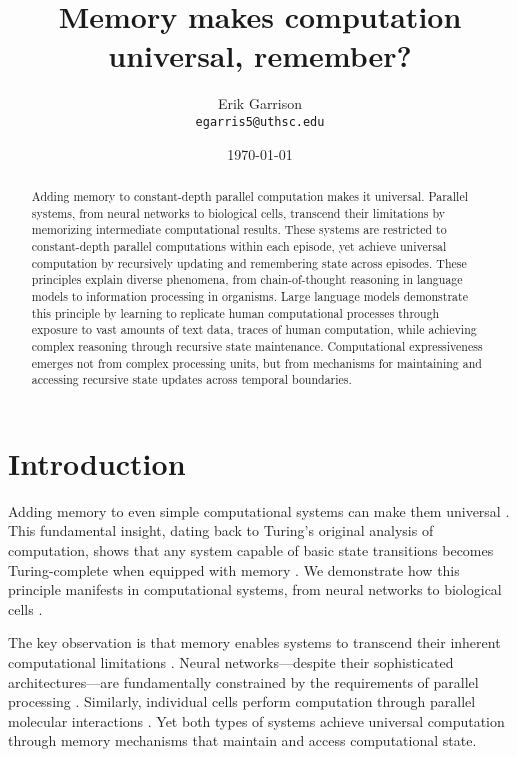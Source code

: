 \documentclass[12pt]{article}
\title{Memory makes computation universal, remember?}
\author{Erik Garrison\\
  \texttt{egarris5@uthsc.edu}\\[1ex]
  }
\date{\today}
\begin{document}
\maketitle

\begin{abstract}
Adding memory to constant-depth parallel computation makes it universal.
Parallel systems, from neural networks to biological cells, transcend their limitations by memorizing intermediate computational results.
These systems are restricted to constant-depth parallel computations within each episode, yet achieve universal computation by recursively updating and remembering state across episodes.
These principles explain diverse phenomena, from chain-of-thought reasoning in language models to information processing in organisms.
Large language models demonstrate this principle by learning to replicate human computational processes through exposure to vast amounts of text data, traces of human computation, while achieving complex reasoning through recursive state maintenance.
Computational expressiveness emerges not from complex processing units, but from mechanisms for maintaining and accessing recursive state updates across temporal boundaries.
\end{abstract}

\section{Introduction}
Adding memory to even simple computational systems can make them universal \cite{merrill2023parallelism,peng2024limitations}. This fundamental insight, dating back to Turing's original analysis of computation, shows that any system capable of basic state transitions becomes Turing-complete when equipped with memory \cite{swamy1983space,bisaz2024memory}. We demonstrate how this principle manifests in computational systems, from neural networks to biological cells \cite{wang2023parallel}.

The key observation is that memory enables systems to transcend their inherent computational limitations \cite{barrett2019analyzing,ganguli2018intertwined}. Neural networks---despite their sophisticated architectures---are fundamentally constrained by the requirements of parallel processing \cite{cai2024efficient}. Similarly, individual cells perform computation through parallel molecular interactions \cite{fu2023scgrn,hoel2020emergence}. Yet both types of systems achieve universal computation through memory mechanisms that maintain and access computational state.
\end{document}
